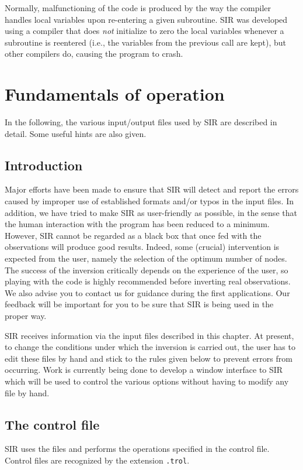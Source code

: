 Normally, malfunctioning of the code is produced by the way the
compiler handles local variables upon re-entering a given subroutine.
SIR was developed using a compiler that does {\em not} initialize to
zero the local variables whenever a subroutine is reentered (i.e., the
variables from the previous call are kept), but other compilers do,
causing the program to crash.



\chapter{Fundamentals of operation}
In the following, the various input/output files used by SIR are 
described in detail. Some useful hints are also given.  

\section{Introduction}
Major efforts have been made to ensure that SIR will detect and report
the errors caused by improper use of established formats and/or typos
in the input files. In addition, we have tried to make SIR as
user-friendly as possible, in the sense that the human interaction with
the program has been reduced to a minimum.  However, SIR cannot be
regarded as a black box that once fed with the observations will
produce good results. Indeed, some (crucial) intervention is
expected from the user, namely the selection of the optimum number of
nodes. The
success of the inversion critically depends on the experience of the
user, so playing with the code is highly recommended before inverting
real observations. We also advise you to contact us for guidance during 
the first applications. Our feedback will be important for you to be 
sure that SIR is being used in the proper way.  

SIR receives information via the input files described in this chapter.
At present, to change the conditions under which the inversion is
carried out, the user has to edit these files by hand and stick to the
rules given below to prevent errors from occurring. Work is currently
being done to develop a window interface to SIR which will be
used to control the various options without having to modify any file
by hand.    

\section{The control file}
SIR uses the files and performs the operations specified in the 
control file. Control files are recognized by the extension {\tt .trol}. 
 
